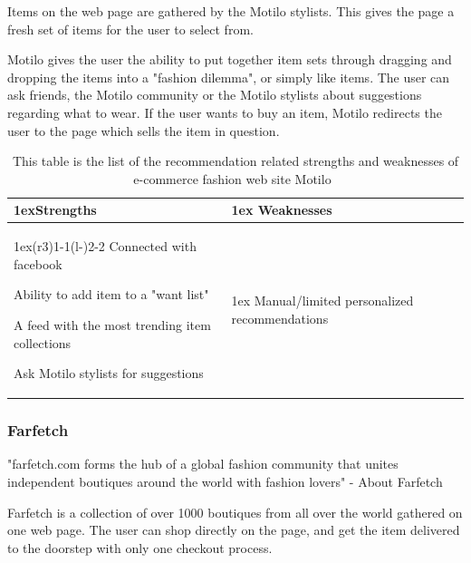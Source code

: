     Items on the web page are gathered by the Motilo stylists.
    This gives the page a fresh set of items for the user to select from.

    Motilo gives the user the ability to put together item sets through dragging and dropping the items into a "fashion dilemma", or simply like items.
    The user can ask friends, the Motilo community or the Motilo stylists about suggestions regarding what to wear.
    If the user wants to buy an item, Motilo redirects the user to the page which sells the item in question.

    \begin{table}[H]
    \centering
    \begin{tabularx}{\linewidth}{>{\parskip1ex}X@{\kern4\tabcolsep}>{\parskip1ex}X}
    	\toprule
    	\hfil\bfseries Strengths
    	&
    	\hfil\bfseries Weaknesses
    		\\\cmidrule(r{3\tabcolsep}){1-1}\cmidrule(l{-\tabcolsep}){2-2}
            Connected with facebook \par
            Ability to add item to a "want list" \par
            A feed with the most trending item collections \par
            Ask Motilo stylists for suggestions \par
            &
            Manual/limited personalized recommendations \par
            \\\bottomrule
            \end{tabularx}
            \caption[Recommendation related strengths and weaknesses of Motilo~\cite{motilo}]{This table is the list of the recommendation related strengths and weaknesses of e-commerce fashion web site Motilo~\cite{motilo}}
            \label{table:ecommenreceMotilo}
        \end{table}




\subsubsection{Farfetch} %
\label{par:farfetch}
    "farfetch.com forms the hub of a global fashion community that unites independent boutiques around the world with fashion lovers" - About Farfetch~\cite{Farfetch}

    Farfetch is a collection of over 1000 boutiques from all over the world gathered on one web page.
    The user can shop directly on the page, and get the item delivered to the doorstep with only one checkout process.

